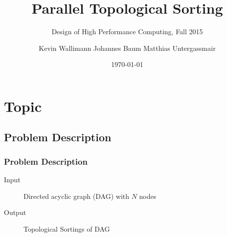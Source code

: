 

\author[]{Kevin Wallimann \quad Johannes Baum \quad Matthias Untergassmair}


\title[Topological Sorting]{Parallel Topological Sorting} %
\subtitle{Design of High Performance Computing, Fall 2015}

\date{\today} %



\begin{frame}
\titlepage %
\end{frame}


\section{Topic}

\subsection{Problem Description}

\begin{frame}
\frametitle{Problem Description}

\begin{description}
	\item[Input] Directed acyclic graph (DAG) with $N$ nodes
	\item[Output] Topological Sortings of DAG
\end{description}

\end{frame}




